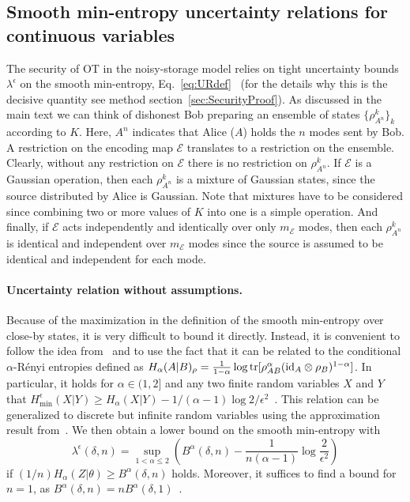 \documentclass[aps,amsfonts,twoside,amssymb,superscriptaddress,twocolumn]{revtex4-1}
\newcommand{\tr}{\operatorname{tr}}
\def\id{{\rm id}}
\def\tr{\mathop{\rm tr}\nolimits}
\newcommand*{\cE}{\mathcal{E}}
\begin{document}
\subsection{Smooth min-entropy uncertainty relations for continuous variables}
\label{sec:uncertaintyrelations}

The security of OT in the noisy-storage model relies on tight uncertainty bounds $\lambda^\epsilon$ on the smooth min-entropy, Eq.~\eqref{eq:URdef}~\cite{tomamichel09} (for the details why this is the decisive quantity see method section~\ref{sec:SecurityProof}). As discussed in the main text we can think of dishonest Bob preparing an ensemble of states $\{\rho_{A^n}^k\}_k$ according to $K$. Here, $A^n$ indicates that Alice ($A$) holds the $n$ modes sent by Bob. A restriction on the encoding map $\cE$ translates to a restriction on the ensemble. Clearly, without any restriction on $\cE$ there is no restriction on $\rho_{A^n}^k$. If $\cE$ is a Gaussian operation, then each $\rho_{A^n}^k$ is a mixture of Gaussian states, since the source distributed by Alice is Gaussian. Note that mixtures have to be considered since combining two or more values of $K$ into one is a simple operation. And finally, if $\cE$ acts independently and identically over only $m_\cE$ modes, then each $\rho_{A^n}^k$ is identical and independent over $m_\cE$ modes since the source is assumed to be identical and independent for each mode. 

\paragraph*{Uncertainty relation without assumptions.}
Because of the maximization in the definition of the smooth min-entropy over close-by states, it is very difficult to bound it directly. Instead, it is convenient to follow the idea from~\cite{Nelly12} and to use the fact that it can be related to the conditional $\alpha$-R{\'e}nyi entropies defined as $H_\alpha(A|B)_\rho = \frac 1 {1-\alpha} \log \tr [\rho_{AB}^\alpha (\id_A\otimes \rho_B)^{1-\alpha}] $. 
In particular, it holds for $\alpha\in(1,2]$ and any two finite random variables $X$ and $Y$ that $H^\epsilon_{\min}(X|Y) \geq H_\alpha(X|Y) - {1}/{(\alpha-1)} \log{2}/{\epsilon^2}$~\cite{Tomamichel08}. This relation can be generalized to discrete but infinite random variables using the approximation result from~\cite{Furrer10}. We then obtain a lower bound on the smooth min-entropy with 
\begin{equation} \label{eq:URrateRenyi}
\lambda^\epsilon(\delta,n) = \sup_{1< \alpha\leq 2} \left(  B^\alpha(\delta,n)  - \frac{1}{n(\alpha-1)} \log\frac{2}{\epsilon^2}\right) 
\end{equation}
if $(1/ n) H_{\alpha}(Z|\theta) \geq B^\alpha(\delta,n) $ holds. Moreover, it suffices to find a bound for $n=1$, as $B^\alpha(\delta,n) = n B^\alpha(\delta,1)$~\cite{Nelly12}. 
\end{document}
